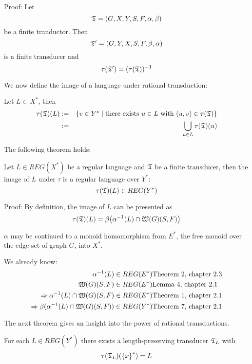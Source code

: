 Proof: Let \[ \mbox{$\mathfrak{T}$} = (G, X, Y, S, F, \alpha, \beta) \] be a finite tranductor.
Then \[ \mbox{$\mathfrak{T'}$} = (G, Y, X, S, F, \beta, \alpha) \] is a finite transducer and
\[ \tau(\mbox{$\mathfrak{T'}$}) = (\tau(\mbox{$\mathfrak{T}$}))^{-1} \]

We now define the image of a language under rational transduction:

\begin{definition}
Let $L \subset X^*$, then
\begin{eqnarray*}
\tau(\mbox{$\mathfrak{T}$})(L) & := & \mbox{$\{v \in Y^* \mid \mbox{there exists } u \in L \mbox{
with } (u, v) \in \tau(\mbox{$\mathfrak{T}$})\}$} \\
& := & \bigcup_{u \in L} \tau(\mbox{$\mathfrak{T}$})(u)
\end{eqnarray*}
\end{definition}

The following theorem holds:

\begin{theorem}
Let $L \in REG(X^*)$ be a regular language and $\mbox{$\mathfrak{T}$}$ be a finite transducer,
then the image of $L$ under $\tau$ is a regular language over $Y^*$:
\[ \tau(\mbox{$\mathfrak{T}$})(L) \in REG(Y^*) \]
\end{theorem}

Proof: By definition, the image of $L$ can be presented as
\[ \tau(\mbox{$\mathfrak{T}$})(L) = \beta\big( \alpha^{-1}(L) \cap \mbox{$\mathfrak{W}(G)$}(S, F) \big) \]

$\alpha$ may be continued to a monoid homomorphism from $E^*$, the free monoid
over the edge set of graph $G$, into $X^*$.

We already know:
\begin{eqnarray*}
\alpha^{-1}(L) \in REG(E^*)    & \mbox{Theorem 2, chapter 2.3} \\
\mbox{$\mathfrak{W}(G)$}(S, F) \in REG(E^*) & \mbox{Lemma 4, chapter 2.1} \\
\Rightarrow \alpha^{-1}(L) \cap \mbox{$\mathfrak{W}(G)$}(S, F) \in
REG(E^*) & \mbox{Theorem 1, chapter 2.1} \\
\Rightarrow \beta(\alpha^{-1}(L) \cap \mbox{$\mathfrak{W}(G)$}(S, F)) \in
REG(Y^*) & \mbox{Theorem 7, chapter 2.1}
\end{eqnarray*}

The next theorem gives an insight into the power of rational transductions.

\begin{theorem}
For each $L \in REG(Y^*)$ there exists a length-preserving transducer
$\mbox{$\mathfrak{T}$}_L$ with \[ \tau(\mbox{$\mathfrak{T}$}_L)(\mbox{$\{x\}$}^*) = L \]
\end{theorem}

